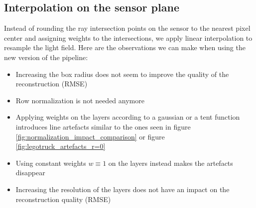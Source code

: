 \documentclass[11pt,a4paper,titlepage]{article}
\begin{document}
\subsection{Interpolation on the sensor plane}

Instead of rounding the ray intersection points on the sensor to the nearest pixel center and assigning weights to the intersections, we apply linear interpolation to resample the light field. Here are the observations we can make when using the new version of the pipeline:

\begin{itemize}
	\item	Increasing the box radius does not seem to improve the quality of the reconstruction (RMSE)
	\item 	Row normalization is not needed anymore
	\item	Applying weights on the layers according to a gaussian or a tent function introduces line artefacts similar to the ones seen in figure \ref{fig:normalization_impact_comparison} or figure \ref{fig:legotruck_artefacts_r=0}
	\item	Using constant weights $w \equiv 1$ on the layers instead makes the artefacts disappear
	\item 	Increasing the resolution of the layers does not have an impact on the reconstruction quality (RMSE)
\end{itemize}
\end{document}
